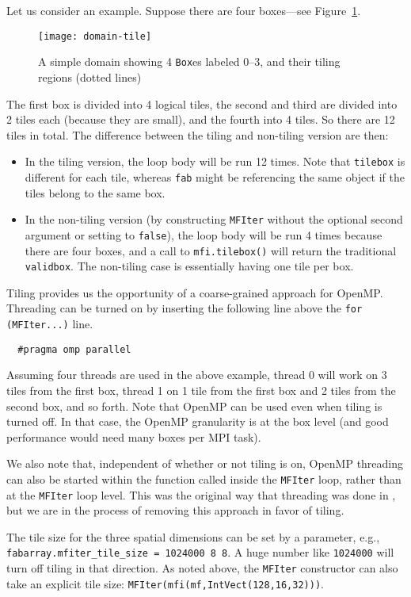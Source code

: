 Let us consider an example.  Suppose there are four boxes---see
Figure~\ref{fig:domain-tiling}.
\begin{figure}[t]
\centering
\texttt{[image: domain-tile]}
\caption{\label{fig:domain-tiling} A simple domain showing 4
  {\tt Box}es labeled 0--3, and their tiling regions (dotted lines)}
\end{figure}
%
The first box is divided into 4 logical tiles, the second and third
are divided into 2 tiles each (because they are small), and the fourth
into 4 tiles.  So there are 12 tiles in total.  The difference between
the tiling and non-tiling version are then:
\begin{itemize}
\item In the tiling version,
the loop body will be run 12 times.  Note that {\tt tilebox} is
different for each tile, whereas {\tt fab} might be referencing the
same object if the tiles belong to the same box.

\item In the non-tiling
version (by constructing {\tt MFIter} without the optional second
argument or setting to {\tt false}), the loop body will be run 4 times
because there are four boxes, and a call to {\tt mfi.tilebox()} will
return the traditional {\tt validbox}.  The non-tiling case is
essentially having one tile per box.
\end{itemize}
 
Tiling provides us the opportunity of a coarse-grained approach for
OpenMP.  Threading can be turned on by inserting the following line
above the {\tt for (MFIter...)} line.
\begin{lstlisting}
  #pragma omp parallel
\end{lstlisting}
Assuming four threads are used in the above example, thread 0 will
work on 3 tiles from the first box, thread 1 on 1 tile from the first
box and 2 tiles from the second box, and so forth.  Note that 
OpenMP can be used even when tiling is turned off.  In that case, the
OpenMP granularity is at the box level (and good performance would need
many boxes per MPI task).

We also note that, independent of whether or not tiling is on, OpenMP
threading can also be started within the function called inside the
{\tt MFIter} loop, rather than at the {\tt MFIter} loop level.  This
was the original way that threading was done in \iamr, but we are in
the process of removing this approach in favor of tiling.

The tile size for the three spatial dimensions can be set by a
parameter, e.g., {\tt fabarray.mfiter\_tile\_size = 1024000 8 8}.  A
huge number like {\tt 1024000} will turn off tiling in that direction.
As noted above, the {\tt MFIter} constructor can also take an explicit
tile size: {\tt MFIter(mfi(mf,IntVect(128,16,32)))}.

